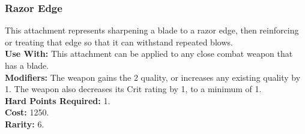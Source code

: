 \subsubsection{Razor Edge}
This attachment represents sharpening a blade to
a razor edge, then reinforcing or treating that edge
so that it can withstand repeated blows.\\
\textbf{Use With:} This attachment can be applied to any close
    combat weapon that has a blade.\\
\textbf{Modifiers:} The weapon gains the  2 quality, or
    increases any existing  quality by 1. The weapon
    also decreases its Crit rating by 1, to a minimum of 1.\\
\textbf{Hard Points Required:} 1.\\
\textbf{Cost:} 1250.\\
\textbf{Rarity:} 6.\\
